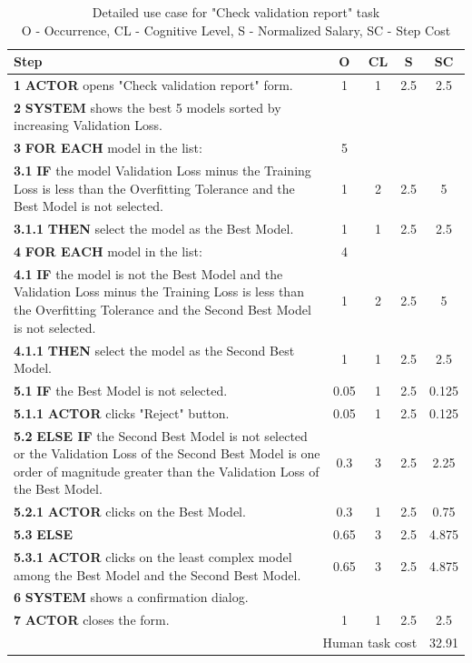 \begin{table}[H]
\centering
\begin{tabularx}{\textwidth}{|X|c|c|c|c|}
\hline
\textbf{Step} & \textbf{O} & \textbf{CL} & \textbf{S} & \textbf{SC} \\
\hline
\textbf{1} \textbf{ACTOR} opens "Check validation report" form. & 1 & 1 & 2.5 & 2.5 \\
\hline
\textbf{2} \textbf{SYSTEM} shows the best 5 models sorted by increasing Validation Loss. & & & & \\
\hline
\textbf{3} \textbf{FOR EACH} model in the list: & 5 & & & \\
\hline
\textbf{3.1} \textbf{IF} the model Validation Loss minus the Training Loss is less than the Overfitting Tolerance and the Best Model is not selected. & 1 & 2 & 2.5 & 5 \\
\hline
\textbf{3.1.1} \textbf{THEN} select the model as the Best Model. & 1 & 1 & 2.5 & 2.5 \\
\hline
\textbf{4} \textbf{FOR EACH} model in the list: & 4 & & & \\
\hline
\textbf{4.1} \textbf{IF} the model is not the Best Model and the Validation Loss minus the Training Loss is less than the Overfitting Tolerance and the Second Best Model is not selected. & 1 & 2 & 2.5 & 5 \\
\hline
\textbf{4.1.1} \textbf{THEN} select the model as the Second Best Model. & 1 & 1 & 2.5 & 2.5 \\
\hline
\textbf{5.1} \textbf{IF} the Best Model is not selected. & 0.05 & 1 & 2.5 & 0.125 \\
\hline
\textbf{5.1.1} \textbf{ACTOR} clicks "Reject" button. & 0.05 & 1 & 2.5 & 0.125\\
\hline
\textbf{5.2} \textbf{ELSE IF} the Second Best Model is not selected or the Validation Loss of the Second Best Model is one order of magnitude greater than the Validation Loss of the Best Model. & 0.3 & 3 & 2.5 & 2.25 \\
\hline
\textbf{5.2.1} \textbf{ACTOR} clicks on the Best Model. & 0.3 & 1 & 2.5 & 0.75 \\
\hline
\textbf{5.3} \textbf{ELSE} & 0.65 & 3 & 2.5 & 4.875 \\
\hline
\textbf{5.3.1} \textbf{ACTOR} clicks on the least complex model among the Best Model and the Second Best Model. & 0.65 & 3 & 2.5 & 4.875 \\
\hline
\textbf{6} \textbf{SYSTEM} shows a confirmation dialog. & & & & \\
\hline
\textbf{7} \textbf{ACTOR} closes the form. & 1 & 1 & 2.5 & 2.5 \\
\hline
\multicolumn{4}{|r|}{Human task cost} & 32.91 \\
\hline
\end{tabularx}
\caption{Detailed use case for "Check validation report" task\\ 
O - Occurrence, CL - Cognitive Level, S - Normalized Salary, SC - Step Cost}
\label{table:check_validation_report}
\end{table}

